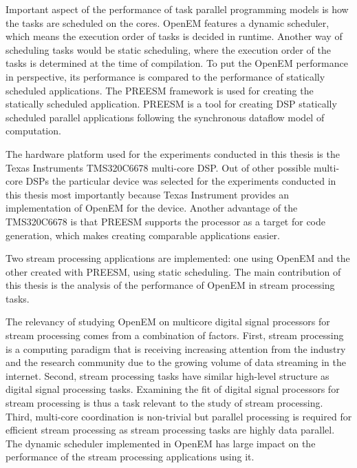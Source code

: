 Important aspect of the performance of task parallel programming models is how the tasks are scheduled on the cores. OpenEM features a dynamic scheduler, which means the execution order of tasks is decided in runtime. Another way of scheduling tasks would be static scheduling, where the execution order of the tasks is determined at the time of compilation. To put the OpenEM performance in perspective, its performance is compared to the performance of statically scheduled applications. The PREESM framework is used for creating the statically scheduled application. PREESM is a tool for creating DSP statically scheduled parallel applications following the synchronous dataflow model of computation.

The hardware platform used for the experiments conducted in this thesis is the Texas Instruments TMS320C6678 multi-core DSP. Out of other possible multi-core DSPs the particular device was selected for the experiments conducted in this thesis most importantly because Texas Instrument provides an implementation of OpenEM for the device. Another advantage of the TMS320C6678 is that PREESM supports the processor as a target for code generation, which makes creating comparable applications easier.

Two stream processing applications are implemented: one using OpenEM and the other created with PREESM, using static scheduling. The main contribution of this thesis is the analysis of the performance of OpenEM in stream processing tasks.

The relevancy of studying OpenEM on multicore digital signal processors for stream processing comes from a combination of factors. First, stream processing is a computing paradigm that is receiving increasing attention from the industry and the research community due to the growing volume of data streaming in the internet. Second, stream processing tasks have similar high-level structure as digital signal processing tasks. Examining the fit of digital signal processors for stream processing is thus a task relevant to the study of stream processing. Third, multi-core coordination is non-trivial but parallel processing is required for efficient stream processing as stream processing tasks are highly data parallel. The dynamic scheduler implemented in OpenEM has large impact on the performance of the stream processing applications using it.

